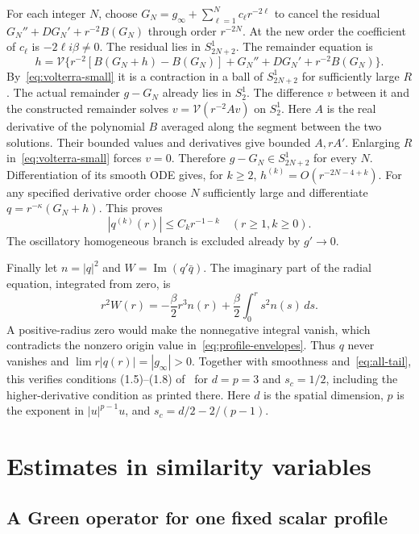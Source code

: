 \documentclass[11pt]{article}
\numberwithin{equation}{section}
\theoremstyle{remark}
\DeclareMathOperator{\Ima}{Im}
\begin{document}
For each integer $N$, choose
$G_N=g_\infty+\sum_{\ell=1}^Nc_\ell r^{-2\ell}$ to cancel the residual
$G_N''+DG_N'+r^{-2}B(G_N)$ through order $r^{-2N}$.
At the new order the coefficient of $c_\ell$ is $-2\ell i\beta\ne0$.
The residual lies in $S_{2N+2}^1$. The remainder equation is
\[
 h=\mathcal V\{r^{-2}[B(G_N+h)-B(G_N)]
                  +G_N''+DG_N'+r^{-2}B(G_N)\}.
\]
By~\eqref{eq:volterra-small} it is a contraction in a ball of
$S_{2N+2}^1$ for sufficiently large $R$. The actual remainder $g-G_N$
already lies in $S_2^1$. The difference $v$ between it and the constructed
remainder solves $v=\mathcal V(r^{-2}Av)$ on $S_2^1$.
Here $A$ is the real derivative of the polynomial $B$ averaged along the
segment between the two solutions. Their bounded values and derivatives
give bounded $A,rA'$. Enlarging $R$ in~\eqref{eq:volterra-small} forces
$v=0$. Therefore $g-G_N\in S_{2N+2}^1$ for every $N$.
Differentiation of its smooth ODE gives, for $k\ge2$,
$h^{(k)}=O(r^{-2N-4+k})$. For any specified derivative order choose $N$
sufficiently large and differentiate $q=r^{-\kappa}(G_N+h)$. This proves
\begin{equation}\label{eq:all-tail}
 |q^{(k)}(r)|\le C_k r^{-1-k}\quad(r\ge1, k\ge0).
\end{equation}
The oscillatory homogeneous branch is excluded already by $g'\to0$.

Finally let $n=|q|^2$ and $W=\Ima(q'\bar q)$. The imaginary part of the
radial equation, integrated from zero, is
\[
 r^2W(r)=-\frac{\beta}{2}r^3n(r)
                +\frac{\beta}{2}\int_0^r s^2n(s)\,ds.
\]
A positive-radius zero would make the nonnegative integral vanish, which
contradicts the nonzero origin value in~\eqref{eq:profile-envelopes}.
Thus $q$ never vanishes and $\lim r|q(r)|=|g_\infty|>0$.
Together with smoothness and~\eqref{eq:all-tail}, this verifies
conditions (1.5)--(1.8) of~\cite{Li} for $d=p=3$ and $s_c=1/2$,
including the higher-derivative condition as printed there. Here $d$ is
the spatial dimension, $p$ is the exponent in $|u|^{p-1}u$, and
$s_c=d/2-2/(p-1)$.

\section{Estimates in similarity variables}\label{sec:estimates}

\subsection{A Green operator for one fixed scalar profile}
\end{document}

